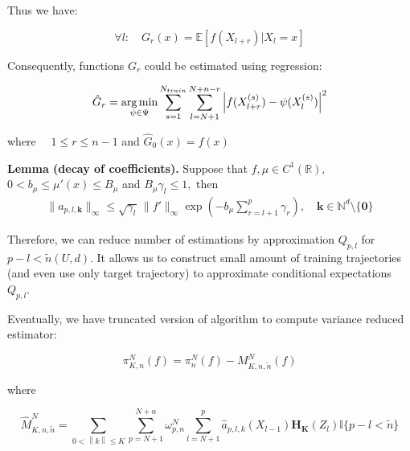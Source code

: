 \documentclass[a4paper]{article}
\newcommand*{\argmin}{\operatornamewithlimits{arg\,min}}
\begin{document}
Thus we have:

\[ \forall l: \quad G_r(x) = \mathbb{E} \left[f(X_{l+r}) | X_l = x \right]\]

Consequently, functions $G_r$ could be estimated using regression:

\[ \hat{G}_r = \argmin_{\psi \in \Psi} \sum_{s = 1}^{N_{train}} \sum_{l = N + 1}^{N+n-r} \left| f(X_{l+r}^{(s)}) - \psi(X_l^{(s)})\right|^2 \] 

where $\quad  1 \leq r \leq n-1$ and $\hat{G}_0(x) = f(x)$

\textbf{Lemma (decay of coefficients).}	
Suppose that \(f,\mu\in C^1(\mathbb{R}),\) \(0<b_\mu\leq \mu'(x)\leq B_\mu\) and \(B_\mu\gamma_{l}\leq 1,\) then
\begin{eqnarray*}
\|a_{p,l,\mathbf{k}}\|_{\infty}\leq \sqrt{\gamma_l}\, \|f'\|_\infty\exp\left(-b_{\mu}\sum_{r=l+1}^p \gamma_{r}  \right),\quad \mathbf{k}\in \mathbb{N}^d\setminus \{\mathbf{0}\}
\end{eqnarray*}


Therefore, we can reduce number of estimations by approximation $Q_{p,l}$ for $p-l < \tilde{n}(U,d)$. It allows us to construct small amount of training trajectories (and even use only target trajectory) to approximate conditional expectations $Q_{p,l}$. 

Eventually, we have truncated version of algorithm to compute variance reduced estimator:

\[ \pi_{K,n}^N(f) = \pi_n^N(f) -  M_{K,n, \tilde{n}}^{N}(f)\]

where 

\[{\widehat  M}_{K,n, \tilde{n}}^N = \sum_{0<\left\| k\right\| \leq K} \sum_{p=N+1}^{N+n} \omega_{p,n}^N
\sum_{l=N+1}^p {\widehat  a}_{p,l,k}(X_{l-1})\mathbf{H_K}(Z_l) \mathbb{I}\{ p-l < \tilde{n} \} \]
\end{document}
